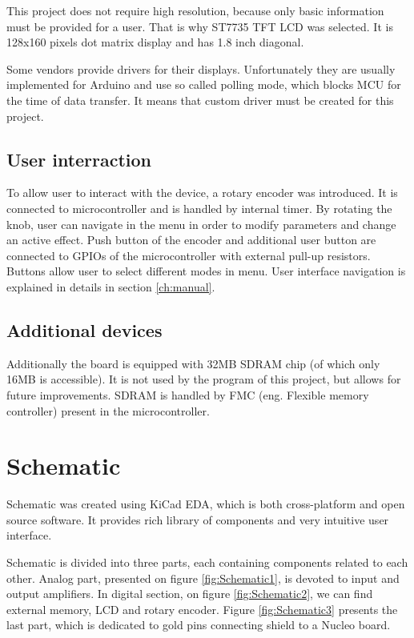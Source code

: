 \documentclass[a4paper,twoside,12pt]{book}
\begin{document}
This project does not require high resolution,
because only basic information must be provided for a user.
That is why ST7735 TFT LCD was selected.
It is 128x160 pixels dot matrix display
and has 1.8 inch diagonal.

Some vendors provide drivers for their displays.
Unfortunately they are usually implemented for Arduino
and use so called polling mode,
which blocks MCU for the time of data transfer.
It means that custom driver must be created for this project.

\subsection{User interraction}
To allow user to interact with the device, a rotary encoder was introduced.
It is connected to microcontroller and is handled by internal timer.
By rotating the knob, user can navigate in the menu
in order to modify parameters and change an active effect.
Push button of the encoder and additional user button are connected
to GPIOs of the microcontroller with external pull-up resistors.
Buttons allow user to select different modes in menu.
User interface navigation is explained in details
in section \ref{ch:manual}.

\subsection{Additional devices}
Additionally the board is equipped with 32MB SDRAM chip
(of which only 16MB is accessible).
It is not used by the program of this project, but allows for future improvements.
SDRAM is handled by FMC (eng. Flexible memory controller) present in the microcontroller.

\section{Schematic}
Schematic was created using KiCad EDA,
which is both cross-platform and open source software.
It provides rich library of components and very intuitive user interface.

Schematic is divided into three parts,
each containing components related to each other.
Analog part, presented on figure \ref{fig:Schematic1}, is devoted to input and output amplifiers.
In digital section, on figure \ref{fig:Schematic2}, we can find external memory, LCD and rotary encoder.
Figure \ref{fig:Schematic3} presents the last part,
which is dedicated to gold pins connecting shield to a Nucleo board.
\end{document}
